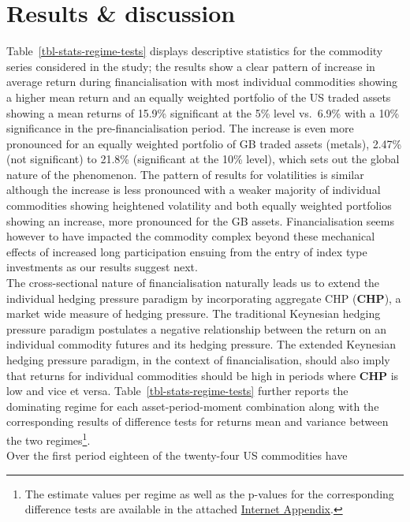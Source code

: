 \documentclass[
  authoryear,
  preprint,
  3p]{elsarticle}
\begin{document}
\newpage

\section{Results \& discussion}\label{sec-results}

Table~\ref{tbl-stats-regime-tests} displays descriptive statistics for
the commodity series considered in the study; the results show a clear
pattern of increase in average return during financialisation with most
individual commodities showing a higher mean return and an equally
weighted portfolio of the US traded assets showing a mean returns of
15.9\% significant at the 5\% level vs.~6.9\% with a 10\% significance
in the pre-financialisation period. The increase is even more pronounced
for an equally weighted portfolio of GB traded assets (metals), 2.47\%
(not significant) to 21.8\% (significant at the 10\% level), which sets
out the global nature of the phenomenon. The pattern of results for
volatilities is similar although the increase is less pronounced with a
weaker majority of individual commodities showing heightened volatility
and both equally weighted portfolios showing an increase, more
pronounced for the GB assets. Financialisation seems however to have
impacted the commodity complex beyond these mechanical effects of
increased long participation ensuing from the entry of index type
investments as our results suggest next.\\
The cross-sectional nature of financialisation naturally leads us to
extend the individual hedging pressure paradigm by incorporating
aggregate CHP (\textbf{CHP}), a market wide measure of hedging pressure.
The traditional Keynesian hedging pressure paradigm postulates a
negative relationship between the return on an individual commodity
futures and its hedging pressure. The extended Keynesian hedging
pressure paradigm, in the context of financialisation, should also imply
that returns for individual commodities should be high in periods where
\textbf{CHP} is low and vice et versa.
Table~\ref{tbl-stats-regime-tests} further reports the dominating regime
for each asset-period-moment combination along with the corresponding
results of difference tests for returns mean and variance between the
two regimes\footnote{The estimate values per regime as well as the
  p-values for the corresponding difference tests are available in the
  attached
  \href{http://bautheac.duckdns.org:3838/bautheac/co-movement/}{Internet
  Appendix}.}.\\
Over the first period eighteen of the twenty-four US commodities have
\end{document}
